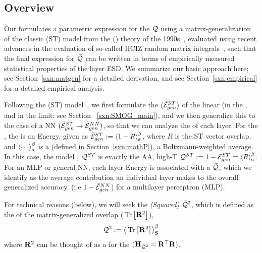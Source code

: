 \subsection{\SETOL Overview}
\label{sxn:setol_overview}


Our \SETOL formulates a parametric expression for the \LayerQuality $\bar{\mathcal{Q}}$ using a matrix-generalization of the classic \StudentTeacher (ST)
model from the \StatisticalMechanicsOfGeneralization (\SMOG) theory of the 1990s~\cite{SST92,STS90}, evaluated using
recent advances in the evaluation of so-called HCIZ random matrix integrals~\cite{potters_bouchaud_2020,Tanaka2007, Tanaka2008},
such that the final expression for $\bar{\mathcal{Q}}$ can be written in terms of empirically measured statistical properties of the layer ESD.
We summarize our basic approach here; see Section~\ref{sxn:matgen} for a detailed derivation, and see Section~\ref{sxn:empirical} for a detailed empirical analysis.

Following the \StudentTeacher (ST) model~\cite{SST92}, 
we first formulate the \GeneralizationError $(\bar{\mathcal{E}}^{ST}_{gen})$ of the linear \Perceptron (in the \emph{\AnnealedApproximation},
and in the \emph{\HighTemperature} limit; see Section ~\ref{sxn:SMOG_main}), and 
we then generalize this to the case of a NN $(\bar{\mathcal{E}}^{ST}_{gen}\rightarrow\bar{\mathcal{E}}^{NN}_{gen})$, so that we can analyze the \Quality of each layer.
For the \Perceptron, the \GeneralizationError is an Energy, given as $\bar{\mathcal{E}}^{ST}_{gen}:=\left\langle 1-R \right\rangle_{\mathbf s}^{\beta}$, where $R$ is the ST vector overlap,
and $\THRMAVG{\cdots}$ is a \emph{\ThermalAverage} (defined in Section~\ref{sxn:mathP}),
a Boltzmann-weighted average.
In this case, the model \Quality, $\bar{\mathcal{Q}}^{ST}$ is exactly the AA, high-T \AverageGeneralizationAccuracy 
{}
$\bar{\mathcal{Q}}^{ST}:=1-\bar{\mathcal{E}}^{ST}_{gen}=\left\langle R \right\rangle_{\mathbf s}^{\beta}$.
For an MLP or general NN, each layer Energy is associated with a
\LayerQuality $\bar{\mathcal{Q}}$, which we identify as the average contribution an
individual layer makes to the overall generalized accuracy.
(i.e $1-\bar{\mathcal{E}}^{NN}_{gen}$) for a multilayer perceptron (MLP).

For technical reasons (below), we will seek the
\emph{\LayerQuality (Squared)} $\bar{\mathcal{Q}}^{2}$, which is defined as the \ThermalAverage
of the matrix-generalized overlap ($\mbox{}\operatorname{Tr}\left[\mathbf{R}^{2}\right]$),
\begin{align}
  \label{eqn:QT}
  \bar{\mathcal{Q}}^{2} :=   \left\langle \mbox{}\operatorname{Tr}\left[\mathbf{R}^{2}\right] \right\rangle_{\mathbf S}^{\beta}
\end{align}
where $\mathbf{R}^{2}$ can be thought of as a \Hamiltonian for the \QualitySquared  $(\mathbf{H}_{\bar{\mathcal{Q}}^{2}}=\mathbf{R}^{\top}\mathbf{R})$.

